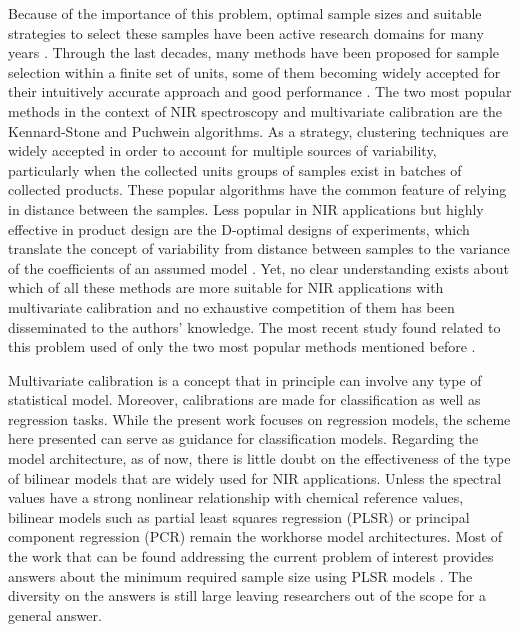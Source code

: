 \documentclass[journal=ancham,manuscript=article]{achemso}
\begin{document}
Because of the importance of this problem, optimal sample sizes and suitable strategies to select these samples have been active research domains for many years \cite{Ferre1996,Au2020, Liu2019}. Through the last decades, many methods have been proposed for sample selection within a finite set of units, some of them becoming widely accepted for their intuitively accurate approach and good performance \cite{Shetty2012a, Nawar2018, He2015}. The two most popular methods in the context of NIR spectroscopy and multivariate calibration are the Kennard-Stone\cite{Kennard1969} and  Puchwein\cite{Puchwein1988} algorithms. As a strategy, clustering techniques are widely accepted in order to account for multiple sources of variability\cite{Naes1990}, particularly when the collected units groups of samples exist in batches of collected products\cite{Bobelyn2010}. These popular algorithms have the common feature of relying in distance between the samples. Less popular in NIR applications but highly effective in product design are the D-optimal designs of experiments, which translate the concept of variability from distance between samples to the variance of the coefficients of an assumed model \cite{Goos2011}. Yet, no clear understanding exists about which of all these methods are more suitable for NIR applications with multivariate calibration and no exhaustive competition of them has been disseminated to the authors' knowledge. The most recent study found related to this problem used of only the two most popular methods mentioned before \cite{Au2020}.

Multivariate calibration is a concept that in principle can involve any type of statistical model. Moreover, calibrations are made for classification as well as regression tasks. While the present work focuses on regression models, the scheme here presented can serve as guidance for classification models. Regarding the model architecture, as of now, there is little doubt on the effectiveness of the type of bilinear models that are widely used for NIR applications. Unless the spectral values have a strong nonlinear relationship with chemical reference values, bilinear models such as partial least squares regression (PLSR) or principal component regression (PCR) remain the workhorse model architectures. Most of the work that can be found addressing the current problem of interest provides answers about the minimum required sample size using PLSR models \cite{Naes1990, Au2020, Shetty2012a, Rodionova2008}. The diversity on the answers is still large leaving researchers out of the scope for a general answer. 
\end{document}
